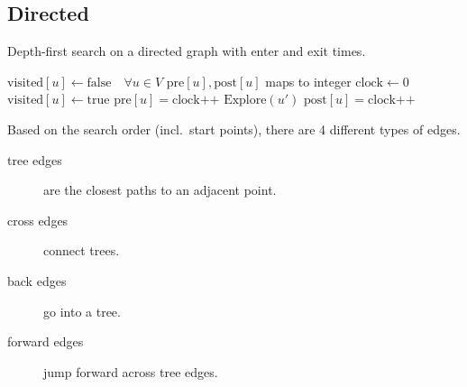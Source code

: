 \subsection{Directed}

\begin{algorithm}
	\caption{Depth-first search on a directed graph with enter and exit times.}
	\begin{algorithmic}
		\State \(\text{visited}[u]\leftarrow \text{false}\quad  \forall u\in V\)
		\State \(\text{pre}[u], \text{post}[u]\) maps to integer
		\State \(\text{clock} \leftarrow 0 \)
		\State \(\text{visited}[u]\leftarrow\text{true}\)
			\State \(\text{pre}[u] = \text{clock++}\)
		\State \(\text{Explore}(u')\)
		\EndIf
			\State\(\text{post}[u] = \text{clock++}\)
		\EndFor
		\EndFunction
	\end{algorithmic}
\end{algorithm}

Based on the search order (incl.~start points), there are 4 different types of edges.
\begin{description}
	\item[tree edges] are the closest paths to an adjacent point.
	\item[cross edges] connect trees.
	\item[back edges] go into a tree.
	\item[forward edges] jump forward across tree edges.
\end{description}